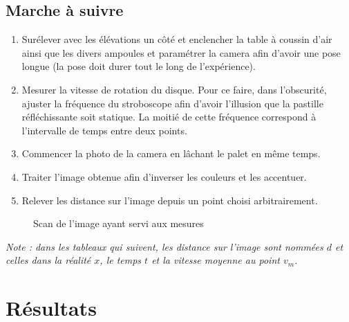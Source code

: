 \documentclass[11pt]{article}
\begin{document}
\subsection{Marche à suivre}
\begin{enumerate}
     \item Surélever avec les élévations un côté et enclencher la table à coussin d’air ainsi que les divers ampoules et paramétrer la camera afin d’avoir une pose longue (la pose doit durer tout le long de l’expérience).
     \item Mesurer la vitesse de rotation du disque. Pour ce faire, dans l’obscurité, ajuster la fréquence du stroboscope afin d’avoir l’illusion que la pastille réfléchissante soit statique. La moitié de cette fréquence correspond à l’intervalle de temps entre deux points.
     \item Commencer la photo de la camera en lâchant le palet en même temps.
     \item Traiter l’image obtenue afin d’inverser les couleurs et les accentuer.
     \item Relever les distance sur l’image depuis un point choisi arbitrairement.
\end{enumerate}
\begin{center}
\begin{figure}[H]
  \caption{Scan de l'image ayant servi aux mesures}
\end{figure}
\end{center}
\textit{Note : dans les tableaux qui suivent, les distance sur l’image sont nommées $d$ et celles dans la réalité $x$, le temps $t$ et la vitesse moyenne au point $v_m$.}

    
\section{Résultats}
\end{document}
